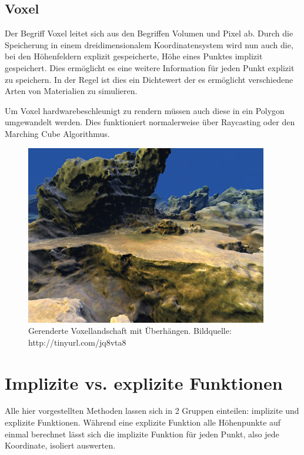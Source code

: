 \subsection{Voxel}
Der Begriff Voxel leitet sich aus den Begriffen Volumen und Pixel ab.
Durch die Speicherung in einem dreidimensionalem Koordinatensystem wird nun auch die, bei den Höhenfeldern explizit gespeicherte, Höhe eines Punktes implizit gespeichert. Dies ermöglicht es eine weitere Information für jeden Punkt explizit zu speichern. In der Regel ist dies ein Dichtewert der es ermöglicht verschiedene Arten von Materialien zu simulieren.

Um Voxel hardwarebeschleunigt zu rendern müssen auch diese in ein Polygon umgewandelt werden. Dies funktioniert normalerweise über Raycasting oder den Marching Cube Algorithmus.

\begin{figure}
	\centering
	\includegraphics[width=\textwidth]{images/voxel_rendered.jpg}
	\caption{Gerenderte Voxellandschaft mit Überhängen. Bildquelle: http://tinyurl.com/jq8vta8}\label{img.heightfield}
\end{figure}

\section{Implizite vs. explizite Funktionen}
Alle hier vorgestellten Methoden lassen sich in 2 Gruppen einteilen: implizite und explizite Funktionen.
Während eine explizite Funktion alle Höhenpunkte auf einmal berechnet lässt sich die implizite Funktion für jeden Punkt, also jede Koordinate, isoliert auswerten. 

